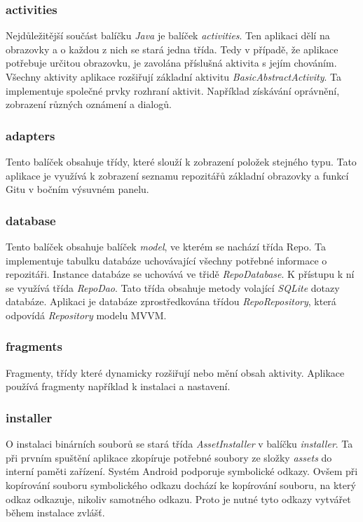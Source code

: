             \newpage
            \subsubsection{activities}
            Nejdůležitější součást balíčku \emph{Java} je balíček \emph{activities}. Ten aplikaci dělí na obrazovky a o každou z nich se stará jedna třída. Tedy v případě, že aplikace potřebuje určitou obrazovku, je zavolána příslušná aktivita s jejím chováním. Všechny aktivity aplikace rozšiřují základní aktivitu \emph{BasicAbstractActivity}. Ta implementuje společné prvky rozhraní aktivit. Například získávání oprávnění, zobrazení různých oznámení a dialogů.

            \subsubsection{adapters}
            Tento balíček obsahuje třídy, které slouží k zobrazení položek stejného typu. Tato aplikace je využívá k zobrazení seznamu repozitářů základní obrazovky a funkcí Gitu v bočním výsuvném panelu.  

            \subsubsection{database}
            Tento balíček obsahuje balíček \emph{model}, ve kterém se nachází třída Repo. Ta implementuje tabulku databáze uchovávající všechny potřebné informace o repozitáři. Instance databáze se uchovává ve třidě \emph{RepoDatabase}. K přístupu k ní se využívá třída \emph{RepoDao}. Tato třída obsahuje metody volající \emph{SQLite} dotazy databáze. Aplikaci je databáze zprostředkována třídou \emph{RepoRepository}, která odpovídá \emph{Repository} modelu MVVM.

            \subsubsection{fragments}
            Fragmenty, třídy které dynamicky rozšiřují nebo mění obsah aktivity. Aplikace používá fragmenty například k instalaci a nastavení.

            \subsubsection{installer}
            O instalaci binárních souborů se stará třída \emph{AssetInstaller} v balíčku \emph{installer}. Ta při prvním spuštění aplikace zkopíruje potřebné soubory ze složky \emph{assets} do interní paměti zařízení. Systém Android podporuje symbolické odkazy. Ovšem při kopírování souboru symbolického odkazu dochází ke kopírování souboru, na který odkaz odkazuje, nikoliv samotného odkazu. Proto je nutné tyto odkazy vytvářet během instalace zvlášť.

